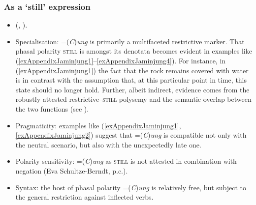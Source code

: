 \subsubsection{As a \lq{}still\rq{} expression}
\begin{itemize}
	\item \citeauthor{SchultzeBerndt2000} (\citeyear[140]{SchultzeBerndt2000}, \citeyear{SchultzeBerndt2002}).
	\item Specialisation: \mbox{=(\textit{C})\textit{ung}} is primarily a multifaceted restrictive marker. That phasal polarity \textsc{still} is amongst its denotata becomes evident in examples like (\ref{exAppendixJaminjung1}–\ref{exAppendixJaminjung4}). For instance, in (\ref{exAppendixJaminjung1}) the fact that the rock remains covered with water is in contrast with the assumption that, at this particular point in time, this state should no longer hold. Further, albeit indirect, evidence comes from the robustly attested restrictive–\textsc{still} polysemy and the semantic overlap between the two functions (see ).
	\item Pragmaticity: examples like (\ref{exAppendixJaminjung1}, \ref{exAppendixJaminjung2}) suggest that \mbox{=(\textit{C})\textit{ung}} is compatible not only with the neutral scenario, but also with the unexpectedly late one.
	\item Polarity sensitivity: \mbox{=(\textit{C})\textit{ung}} as \textsc{still} is not attested in combination with negation (Eva Schultze-Berndt, p.c.).
	\item Syntax: the host of phasal polarity \mbox{=(\textit{C})\textit{ung}} is relatively free, but subject to the general restriction against inflected verbs.
\end{itemize}
